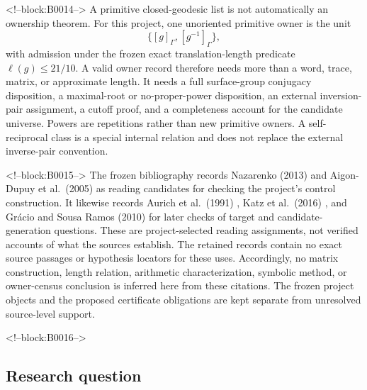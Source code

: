 \documentclass[11pt,a4paper]{article}
\begin{document}
<!--block:B0014-->
A primitive closed-geodesic list is not automatically an ownership theorem. For this project, one unoriented primitive owner is the unit \[
\{[g]_{\Gamma},[g^{-1}]_{\Gamma}\},
\] with admission under the frozen exact translation-length predicate \(\ell(g)\leq 21/10\). A valid owner record therefore needs more than a word, trace, matrix, or approximate length. It needs a full surface-group conjugacy disposition, a maximal-root or no-proper-power disposition, an external inversion-pair assignment, a cutoff proof, and a completeness account for the candidate universe. Powers are repetitions rather than new primitive owners. A self-reciprocal class is a special internal relation and does not replace the external inverse-pair convention.

<!--block:B0015-->
The frozen bibliography records Nazarenko (2013)
\citep{P33-S01}
 and Aigon-Dupuy et al.~(2005)
\citep{P33-S02}
 as reading candidates for checking the project's control construction. It likewise records Aurich et al.~(1991)
\citep{P33-S05}
, Katz et al.~(2016)
\citep{P33-S08}
, and Grácio and Sousa Ramos (2010)
\citep{P33-S09}
 for later checks of target and candidate-generation questions. These are project-selected reading assignments, not verified accounts of what the sources establish. The retained records contain no exact source passages or hypothesis locators for these uses. Accordingly, no matrix construction, length relation, arithmetic characterization, symbolic method, or owner-census conclusion is inferred here from these citations. The frozen project objects and the proposed certificate obligations are kept separate from unresolved source-level support.

<!--block:B0016-->
\hypertarget{research-question}{%
\subsection{Research question}\label{research-question}}
\end{document}
